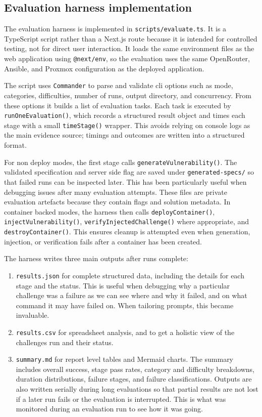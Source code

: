 \subsection{Evaluation harness implementation}\label{sec:evaluation-harness-implementation}

The evaluation harness is implemented in \lstinline{scripts/evaluate.ts}. It is a TypeScript script rather than a Next.js route because it is intended for controlled testing, not for direct user interaction. It loads the same environment files as the web application using \lstinline{@next/env}, so the evaluation uses the same OpenRouter, Ansible, and Proxmox configuration as the deployed application.

The script uses \lstinline{Commander} to parse and validate \gls{cli} options such as mode, categories, difficulties, number of runs, output directory, and concurrency. From these options it builds a list of evaluation tasks. Each task is executed by \lstinline{runOneEvaluation()}, which records a structured result object and times each stage with a small \lstinline{timeStage()} wrapper. This avoids relying on console logs as the main evidence source; timings and outcomes are written into a structured format.

For non deploy modes, the first stage calls \lstinline{generateVulnerability()}. The validated specification and server side flag are saved under \lstinline{generated-specs/} so that failed runs can be inspected later. This has been particularly useful when debugging issues after many evaluation attempts. These files are private evaluation artefacts because they contain flags and solution metadata. In container backed modes, the harness then calls \lstinline{deployContainer()}, \lstinline{injectVulnerability()}, \lstinline{verifyInjectedChallenge()} where appropriate, and \lstinline{destroyContainer()}. This ensures cleanup is attempted even when generation, injection, or verification fails after a container has been created.

The harness writes three main outputs after runs complete:

\begin{enumerate}
	\item \lstinline{results.json} for complete structured data, including the details for each stage and the status. This is useful when debugging why a particular challenge was a failure as we can see where and why it failed, and on what command it may have failed on. When tailoring prompts, this became invaluable.
	\item \lstinline{results.csv} for spreadsheet analysis, and to get a holistic view of the challenges run and their status.
	\item \lstinline{summary.md} for report level tables and Mermaid charts. The summary includes overall success, stage pass rates, category and difficulty breakdowns, duration distributions, failure stages, and failure classifications. Outputs are also written serially during long evaluations so that partial results are not lost if a later run fails or the evaluation is interrupted. This is what was monitored during an evaluation run to see how it was going.
\end{enumerate}


